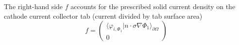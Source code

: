 The right-hand side $f$ accounts for the prescribed solid current density on
the cathode current collector tab (current divided by tab surface area)
\begin{equation}
    f =
    \begin{pmatrix}
    \langle \varphi_{i,\Phi_1} \vert n \cdot \sigma \nabla \Phi_1 \rangle_{\partial\Omega} \\
    0
    \end{pmatrix}
\end{equation}

